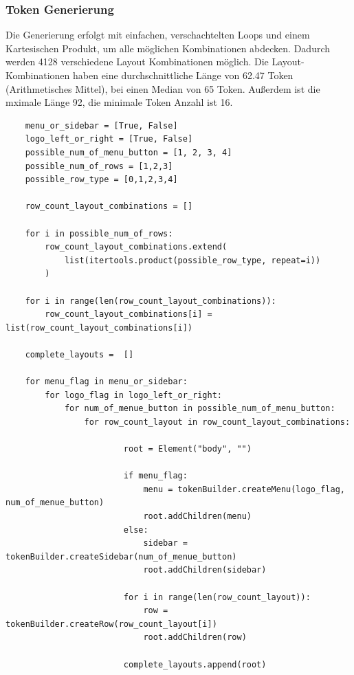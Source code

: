 \documentclass[pdftex,a4paper,halfparskip, article]{scrartcl}
\begin{document}
\subsubsection{Token Generierung}

Die Generierung erfolgt mit einfachen, verschachtelten Loops und einem Kartesischen Produkt, um alle möglichen Kombinationen abdecken. Dadurch werden 4128 verschiedene Layout Kombinationen möglich. 
Die Layout-Kombinationen haben eine durchschnittliche Länge von 62.47 Token (Arithmetisches Mittel), bei einen Median von 65 Token. Außerdem ist die mximale Länge 92, die minimale Token Anzahl ist 16.

\begin{verbatim}
    menu_or_sidebar = [True, False]
    logo_left_or_right = [True, False]
    possible_num_of_menu_button = [1, 2, 3, 4]
    possible_num_of_rows = [1,2,3]
    possible_row_type = [0,1,2,3,4]

    row_count_layout_combinations = []

    for i in possible_num_of_rows:
        row_count_layout_combinations.extend( 
            list(itertools.product(possible_row_type, repeat=i))
        )

    for i in range(len(row_count_layout_combinations)):
        row_count_layout_combinations[i] = list(row_count_layout_combinations[i])

    complete_layouts =  []

    for menu_flag in menu_or_sidebar:
        for logo_flag in logo_left_or_right:
            for num_of_menue_button in possible_num_of_menu_button:
                for row_count_layout in row_count_layout_combinations:

                        root = Element("body", "")

                        if menu_flag:
                            menu = tokenBuilder.createMenu(logo_flag, num_of_menue_button)
                            root.addChildren(menu)
                        else:
                            sidebar = tokenBuilder.createSidebar(num_of_menue_button)
                            root.addChildren(sidebar)

                        for i in range(len(row_count_layout)):
                            row = tokenBuilder.createRow(row_count_layout[i])
                            root.addChildren(row)

                        complete_layouts.append(root)
\end{verbatim}
\end{document}
